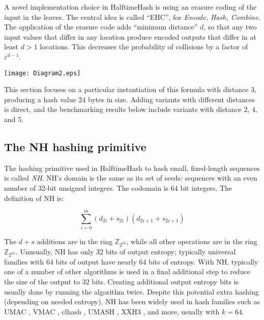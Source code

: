 \documentclass[sigconf, nonacm]{acmart}
\newcommand{\ints}{\mathbb{Z}}
\begin{document}
A novel implementation choice in HalftimeHash is using an erasure coding of the input in the leaves.
The central idea is called ``EHC'', for {\em Encode, Hash, Combine}. \cite{ehc-nandi}
The application of the erasure code adds ``minimum distance'' $d$, so that any two input values that differ in any location produce encoded outputs that differ in at least $d > 1$ locations.
This decreases the probability of collisions by a factor of $\varepsilon^{d-1}$.

\texttt{[image: Diagram2.eps]}

This section focuses on a particular instantiation of this formula with distance $3$, producing a hash value $24$ bytes in size.
Adding variants with different distances is direct, and the benchmarking results below include variants with distance 2, 4, and 5.

\subsection{The NH hashing primitive}

The hashing primitive used in HalftimeHash to hash small, fixed-length sequences is called {\em NH}. \cite{umac}
NH's domain is the same as its set of seeds: sequences with an even number of 32-bit unsigned integers.
The codomain is 64 bit integers.
The definition of NH is:

\[
\sum_{i=0}^m (d_{2i} + s_{2i})(d_{2i+1} + s_{2i+1})
\]

The $d + s$ additions are in the ring $\ints_{2^{32}}$, while all other operations are in the ring $\ints_{2^{64}}$.
Unusually, NH has only $32$ bits of output entropy; typically universal families with $64$ bits of output have nearly $64$ bits of entropy. \cite{umash,clhash}
With NH, typically one of a number of other algorithms is used in a final additional step to reduce the size of the output to $32$ bits.
Creating additional output entropy bits is usually done by running the algorithm twice. \cite{umash,umac}
Despite this potential extra hashing (depending on needed entropy), NH has been widely used in hash families such as UMAC \cite{umac}, VMAC \cite{vmac}, clhash \cite{clhash}, UMASH \cite{umash}, XXH3 \cite{xxh3}, and more, usually with $k = 64$.
\end{document}
